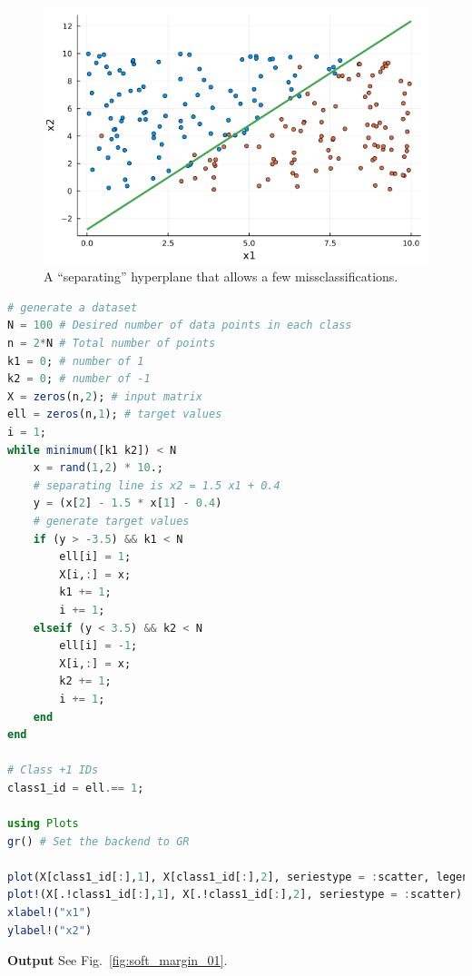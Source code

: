 \begin{figure}[hb!]%
\centering
\includegraphics[width=0.95\columnwidth]{graphics/Chap13SeparatingHyperplanes/SoftMarginSeperated.png}%
\caption[]{A ``separating'' hyperplane that allows a few missclassifications.}    
\label{fig:soft_margin_02}
\end{figure}


\begin{lstlisting}[language=Julia,style=mystyle]
# generate a dataset
N = 100 # Desired number of data points in each class
n = 2*N # Total number of points
k1 = 0; # number of 1
k2 = 0; # number of -1
X = zeros(n,2); # input matrix
ell = zeros(n,1); # target values
i = 1;
while minimum([k1 k2]) < N
    x = rand(1,2) * 10.;
    # separating line is x2 = 1.5 x1 + 0.4
    y = (x[2] - 1.5 * x[1] - 0.4)
    # generate target values
    if (y > -3.5) && k1 < N
        ell[i] = 1;
        X[i,:] = x;
        k1 += 1;
        i += 1;
    elseif (y < 3.5) && k2 < N
        ell[i] = -1;
        X[i,:] = x;
        k2 += 1;
        i += 1;
    end
end

# Class +1 IDs
class1_id = ell.== 1;

using Plots
gr() # Set the backend to GR

plot(X[class1_id[:],1], X[class1_id[:],2], seriestype = :scatter, legend = false)
plot!(X[.!class1_id[:],1], X[.!class1_id[:],2], seriestype = :scatter)
xlabel!("x1")
ylabel!("x2")
\end{lstlisting}
\textbf{Output} 
See Fig.~\ref{fig:soft_margin_01}.

